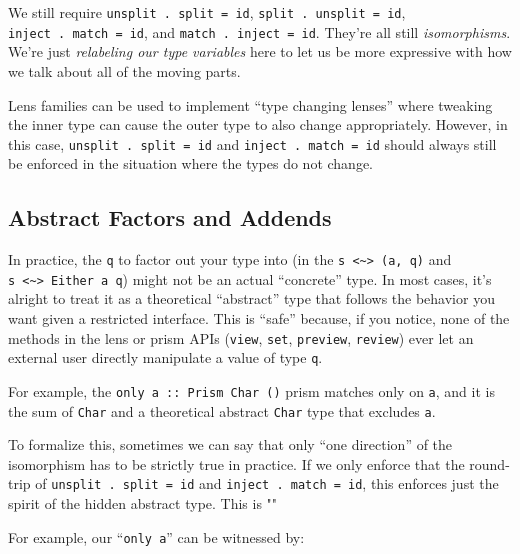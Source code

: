 \documentclass[]{article}
\begin{document}
We still require \texttt{unsplit\ .\ split\ =\ id},
\texttt{split\ .\ unsplit\ =\ id}, \texttt{inject\ .\ match\ =\ id}, and
\texttt{match\ .\ inject\ =\ id}. They're all still \emph{isomorphisms}. We're
just \emph{relabeling our type variables} here to let us be more expressive with
how we talk about all of the moving parts.

Lens families can be used to implement ``type changing lenses'' where tweaking
the inner type can cause the outer type to also change appropriately. However,
in this case, \texttt{unsplit\ .\ split\ =\ id} and
\texttt{inject\ .\ match\ =\ id} should always still be enforced in the
situation where the types do not change.

\hypertarget{abstract-factors-and-addends}{%
\subsection{Abstract Factors and Addends}\label{abstract-factors-and-addends}}

In practice, the \texttt{q} to factor out your type into (in the
\texttt{s\ \textless{}\textasciitilde{}\textgreater{}\ (a,\ q)} and
\texttt{s\ \textless{}\textasciitilde{}\textgreater{}\ Either\ a\ q}) might not
be an actual ``concrete'' type. In most cases, it's alright to treat it as a
theoretical ``abstract'' type that follows the behavior you want given a
restricted interface. This is ``safe'' because, if you notice, none of the
methods in the lens or prism APIs (\texttt{view}, \texttt{set},
\texttt{preview}, \texttt{review}) ever let an external user directly manipulate
a value of type \texttt{q}.

For example, the
\texttt{only\ \textquotesingle{}a\textquotesingle{}\ ::\ Prism\textquotesingle{}\ Char\ ()}
prism matches only on \texttt{\textquotesingle{}a\textquotesingle{}}, and it is
the sum of \texttt{Char} and a theoretical abstract \texttt{Char} type that
excludes \texttt{\textquotesingle{}a\textquotesingle{}}.

To formalize this, sometimes we can say that only ``one direction'' of the
isomorphism has to be strictly true in practice. If we only enforce that the
round-trip of \texttt{unsplit\ .\ split\ =\ id} and
\texttt{inject\ .\ match\ =\ id}, this enforces just the spirit of the hidden
abstract type. This is ""

For example, our ``\texttt{only\ \textquotesingle{}a\textquotesingle{}}'' can be
witnessed by:
\end{document}
